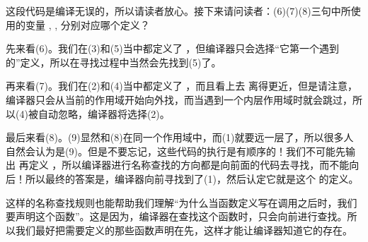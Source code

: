 这段代码是编译无误的，所以请读者放心。接下来请问读者：(6)(7)(8)三句中所使用的变量 \lstinline@c@, \lstinline@b@, \lstinline@a@ 分别对应哪个定义？\par
先来看(6)。我们在(3)和(5)当中都定义了 \lstinline@c@，但编译器只会选择``它第一个遇到的''定义，所以在寻找过程中当然会先找到(5)了。\par
再来看(7)。我们在(2)和(4)当中都定义了 \lstinline@b@，而且看上去 \lstinline@b@ 离得更近，但是请注意，编译器只会从当前的作用域开始向外找，而当遇到一个内层作用域时就会跳过，所以(4)被自动忽略，编译器将选择(2)。\par
最后来看(8)。(9)显然和(8)在同一个作用域中，而(1)就要远一层了，所以很多人自然会认为是(9)。但是不要忘记，这些代码的执行是有顺序的！我们不可能先输出 \lstinline@a@ 再定义 \lstinline@a@，所以编译器进行名称查找的方向都是向前面的代码去寻找，而不能向后！所以最终的答案是，编译器向前寻找到了(1)，然后认定它就是这个 \lstinline@a@ 的定义。\par
这样的名称查找规则也能帮助我们理解``为什么当函数定义写在调用之后时，我们要声明这个函数''。这是因为，编译器在查找这个函数时，只会向前进行查找。所以我们最好把需要定义的那些函数声明在先，这样才能让编译器知道它的存在。\par
